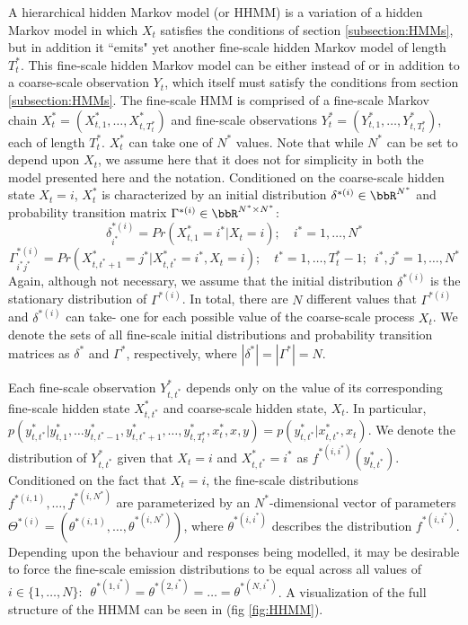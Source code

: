 A hierarchical hidden Markov model (or HHMM) is a variation of a hidden Markov model in which $X_t$ satisfies the conditions of section \ref{subsection:HMMs}, but in addition it ``emits" yet another fine-scale hidden Markov model of length $T_t^*$. This fine-scale hidden Markov model can be either instead of \citep{Barajas:2017} or in addition to \citep{Adam:2019} a coarse-scale observation $Y_t$, which itself must satisfy the conditions from section \ref{subsection:HMMs}. The fine-scale HMM is comprised of a fine-scale Markov chain $X^*_t = (X^*_{t,1}, \ldots, X^*_{t,T^*_t})$ and fine-scale observations $Y^*_t = (Y^*_{t,1}, \ldots, Y^*_{t,T^*_t})$, each of length $T^*_t$. $X^*_t$ can take one of $N^*$ values. Note that while $N^*$ can be set to depend upon $X_t$, we assume here that it does not for simplicity in both the model presented here and the notation. Conditioned on the coarse-scale hidden state $X_t = i$, $X^*_t$ is characterized by an initial distribution $\delta^{*(i)} \in \bbR^{N^*}$ and probability transition matrix $\Gamma^{*(i)} \in \bbR^{N^* \times N^*}$:
%
$$\delta^{*(i)}_{i^*} = Pr(X^*_{t,1} = i^* | X_t = i); \quad i^* = 1,\ldots,N^*$$
%
$$\Gamma^{*(i)}_{i^*j^*} = Pr(X^*_{t,t^*+1} = j^* | X^*_{t,t^*} = i^*, X_t = i); \quad t^* = 1, \ldots, T^*_t-1; \enspace i^*,j^* = 1,\ldots,N^*$$
%
Again, although not necessary, we assume that the initial distribution $\delta^{*(i)}$ is the stationary distribution of $\Gamma^{*(i)}$. In total, there are $N$ different values that $\Gamma^{*(i)}$ and $\delta^{*(i)}$ can take- one for each possible value of the coarse-scale process $X_t$. We denote the sets of all fine-scale initial distributions and probability transition matrices as $\delta^*$ and $\Gamma^*$, respectively, where $|\delta^*| = |\Gamma^*| = N$.

Each fine-scale observation $Y^*_{t,t^*}$ depends only on the value of its corresponding fine-scale hidden state $X^*_{t,t^*}$ and coarse-scale hidden state, $X_t$. In particular, $p(y^*_{t,t^*} | y^*_{t,1}, \ldots y^*_{t,t^*-1},y^*_{t,t^*+1},\ldots,y^*_{t,T^*_t},x^*_t,x,y) = p(y^*_{t,t^*}|x^*_{t,t^*},x_t)$. We denote the distribution of $Y^*_{t,t^*}$ given that $X_t = i$ and $X^*_{t,t^*} = i^*$ as $f^{*(i,i^*)}(y^*_{t,t^*})$. Conditioned on the fact that $X_t = i$, the fine-scale distributions $f^{*(i,1)}, \ldots, f^{*(i,N^*)}$ are parameterized by an $N^*$-dimensional vector of parameters $\Theta^{*(i)} = (\theta^{*(i,1)},\ldots,\theta^{*(i,N^*)})$, where $\theta^{*(i,i^*)}$ describes the distribution $f^{*(i,i^*)}$. Depending upon the behaviour and responses being modelled, it may be desirable to force the fine-scale emission distributions to be equal across all values of $i \in \{1, \ldots, N\}: \enspace \theta^{*(1,i^*)} = \theta^{*(2,i^*)} = \ldots = \theta^{*(N,i^*)}$. A visualization of the full structure of the HHMM can be seen in (fig \ref{fig:HHMM}). 


